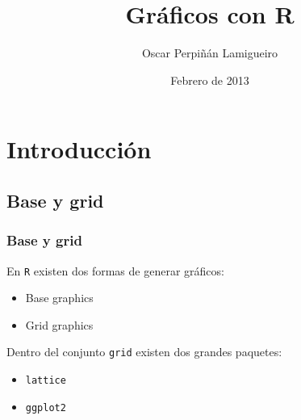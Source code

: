 \documentclass[xcolor={usenames,svgnames,dvipsnames}]{beamer}
\title{Gráficos con R}
\author{Oscar Perpiñán Lamigueiro}
\date{Febrero de 2013}
\begin{document}
\maketitle




\section{Introducción}
\label{sec-1}
\subsection{Base y grid}
\label{sec-1-1}
\begin{frame}
\frametitle{Base y grid}
\label{sec-1-1-1}

 En \texttt{R} existen dos formas de generar gráficos:
\begin{itemize}
\item Base graphics
\item Grid graphics
\end{itemize}

Dentro del conjunto \texttt{grid} existen dos grandes paquetes:
\begin{itemize}
\item \texttt{lattice}
\item \texttt{ggplot2}
\end{itemize}
\end{frame}
\end{document}
